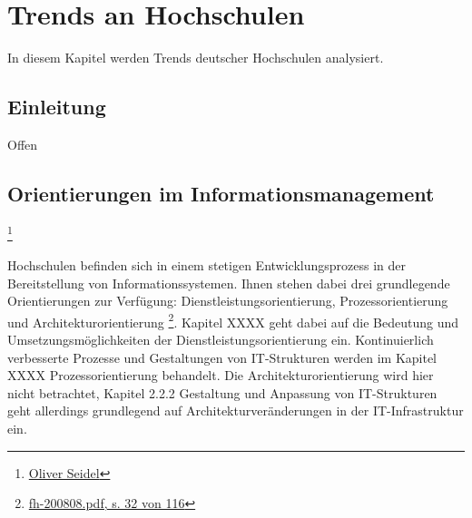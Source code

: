 \documentclass[a4paper, 12pt]{scrreprt}
\begin{document}
\tableofcontents	


\chapter{Trends an Hochschulen}
In diesem Kapitel werden Trends deutscher Hochschulen analysiert.

\section{Einleitung}
Offen

\section{Orientierungen im Informationsmanagement}
\footnote{\url{Oliver Seidel}}

Hochschulen befinden sich in einem stetigen Entwicklungsprozess in der Bereitstellung von Informationssystemen. Ihnen stehen dabei drei grundlegende Orientierungen zur Verfügung: Dienstleistungsorientierung, Prozessorientierung und Architekturorientierung \footnote{\url{fh-200808.pdf, s. 32 von 116}}. Kapitel XXXX geht dabei auf die Bedeutung und Umsetzungsmöglichkeiten der Dienstleistungsorientierung ein. Kontinuierlich verbesserte Prozesse und Gestaltungen von IT-Strukturen werden im Kapitel XXXX Prozessorientierung behandelt. Die Architekturorientierung wird hier nicht betrachtet, Kapitel 2.2.2 Gestaltung und Anpassung von IT-Strukturen geht allerdings grundlegend auf Architekturveränderungen in der IT-Infrastruktur ein.
\end{document}
